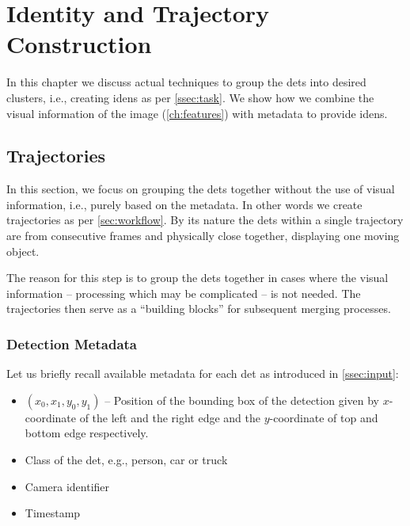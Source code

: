 \chapter{Identity and Trajectory Construction}

\label{ch:iden_construction}


In this chapter we discuss actual techniques to group the \glspl{det} into
desired clusters, i.e., creating \glspl{iden} as per \autoref{ssec:task}.
We show how we combine the visual information of the image
(\autoref{ch:features}) with metadata to provide \glspl{iden}.

\section{Trajectories}

In this section, we focus on grouping the \glspl{det} together without the use of visual information, i.e., purely based on the metadata. In other words we create trajectories as per \autoref{sec:workflow}. By its nature the \glspl{det} within a single trajectory are from consecutive frames and physically close together, displaying one moving object.

The reason for this step is to group the \glspl{det} together in cases
where the visual information -- processing which may be complicated -- is not
needed. The trajectories then serve as a ``building blocks'' for subsequent merging
processes.



\subsection{Detection Metadata}

Let us briefly recall available metadata for each \gls{det} as introduced in
\autoref{ssec:input}:

\begin{itemize}
    \item $(x_0, x_1, y_0, y_1)$ -- Position of the bounding box of the detection given by $x$-coordinate of the left and the right edge and the $y$-coordinate of top and bottom edge respectively.
    \item Class of the \gls{det}, e.g., person, car or truck
    \item Camera identifier
    \item Timestamp
\end{itemize}

